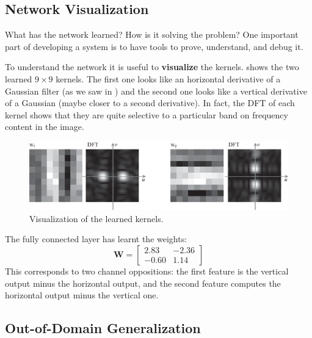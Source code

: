 \subsection{Network Visualization}

What has the network learned? How is it solving the problem? One important part of developing a system is to have tools to prove, understand, and debug it. 

To understand the network it is useful to {\bf visualize} the kernels. \Fig{\ref{fig:convolutional_neural_nets:oriented_bars_cnn_kernels}} shows the two learned $9 \times 9$ kernels. The first one looks like an horizontal derivative of a Gaussian filter (as we saw in \chap{\ref{chapter:image_derivatives}}) and the second one looks like a vertical derivative of a Gaussian (maybe closer to a second derivative). In fact, the DFT of each kernel shows that they are quite selective to a particular band on frequency content in the image.  

\begin{figure}
\includegraphics[width=1.0\linewidth]{./figures/convolutional_neural_nets/oriented_bars_cnn_kernels.eps}
\caption{Visualization of the learned kernels.}
\label{fig:convolutional_neural_nets:oriented_bars_cnn_kernels}
\end{figure}

The fully connected layer has learnt the weights:
\begin{equation}
\mathbf{W} =  
\left[
\begin{array}{cc}
2.83 & -2.36  \\
-0.60 & 1.14  
\end{array}
\right]
\end{equation}
This corresponds to two channel oppositions: the  first feature is the vertical output minus the horizontal output, and the second feature computes the horizontal output minus the vertical one.  

\subsection{Out-of-Domain Generalization}

